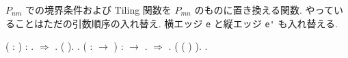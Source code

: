 \documentclass[12pt]{report}
\begin{document}
$P_{nm}$ での境界条件および Tiling 関数を $P_{mn}$ のものに置き換える関数. やっていることはただの引数順序の入れ替え. 横エッジ \verb|e| と縦エッジ \verb|e'| も入れ替える.
 \begin{coqdoccode}
\coqdocemptyline
\coqdocnoindent
{}  ( : ) : .\coqdoceol
\coqdocnoindent
{} \ensuremath{\Rightarrow}  .\coqdoceol
\coqdocnoindent
{} (  ).\coqdoceol
\coqdocnoindent
{}.\coqdoceol
\coqdocemptyline
\coqdocnoindent
{}  ( :  \ensuremath{\rightarrow} ) :  \ensuremath{\rightarrow} .\coqdoceol
\coqdocnoindent
{} \ensuremath{\Rightarrow}   .\coqdoceol
\coqdocnoindent
{} ( ( )  ).\coqdoceol
\coqdocnoindent
{}.\coqdoceol
\coqdocemptyline
\end{coqdoccode}
\end{document}
